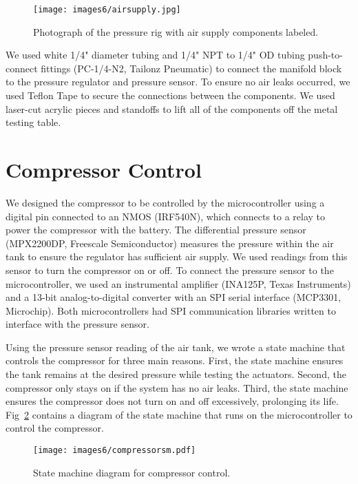 \begin{figure}[!ht]
    \centering
    \texttt{[image: images6/airsupply.jpg]}
    \caption{Photograph of the pressure rig with air supply components labeled.}
    \label{fig:airsupply}
\end{figure}

We used white 1/4" diameter tubing and 1/4" NPT to 1/4" OD tubing push-to-connect fittings (PC-1/4-N2, Tailonz Pneumatic) to connect the manifold block to the pressure regulator and pressure sensor. To ensure no air leaks occurred, we used Teflon Tape to secure the connections between the components. We used laser-cut acrylic pieces and standoffs to lift all of the components off the metal testing table. 

\section{Compressor Control}

We designed the compressor to be controlled by the microcontroller using a digital pin connected to an NMOS (IRF540N), which connects to a relay to power the compressor with the battery. The differential pressure sensor (MPX2200DP, Freescale Semiconductor) measures the pressure within the air tank to ensure the regulator has sufficient air supply. We used readings from this sensor to turn the compressor on or off. To connect the pressure sensor to the microcontroller, we used an instrumental amplifier (INA125P, Texas Instruments) and a 13-bit analog-to-digital converter with an SPI serial interface (MCP3301, Microchip). Both microcontrollers had SPI communication libraries written to interface with the pressure sensor. 

Using the pressure sensor reading of the air tank, we wrote a state machine that controls the compressor for three main reasons. First, the state machine ensures the tank remains at the desired pressure while testing the actuators. Second, the compressor only stays on if the system has no air leaks. Third, the state machine ensures the compressor does not turn on and off excessively, prolonging its life. Fig~\ref{fig:compressorsm} contains a diagram of the state machine that runs on the microcontroller to control the compressor. 

\begin{figure}[ht]
    \centering
    \texttt{[image: images6/compressorsm.pdf]}
    \caption{State machine diagram for compressor control.}
    \label{fig:compressorsm}
\end{figure}

